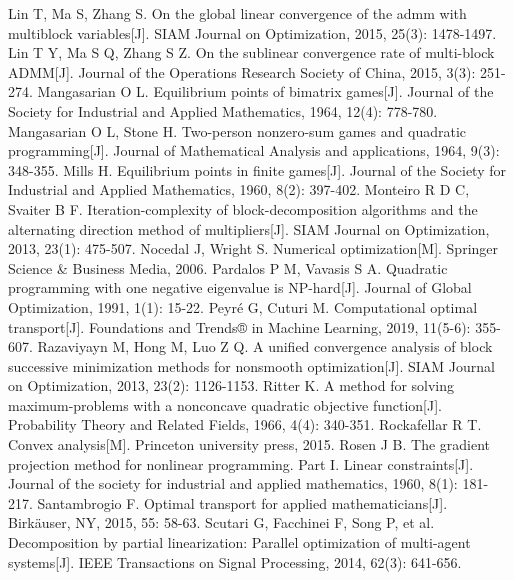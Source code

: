 \begin{thebibliography}{MM}
\begin{small}
		 Lin T, Ma S, Zhang S. On the global linear convergence of the admm with multiblock variables[J]. SIAM Journal on Optimization, 2015, 25(3): 1478-1497.
		 Lin T Y, Ma S Q, Zhang S Z. On the sublinear convergence rate of multi-block ADMM[J]. Journal of the Operations Research Society of China, 2015, 3(3): 251-274.
		 Mangasarian O L. Equilibrium points of bimatrix games[J]. Journal of the Society for Industrial and Applied Mathematics, 1964, 12(4): 778-780.
		 Mangasarian O L, Stone H. Two-person nonzero-sum games and quadratic programming[J]. Journal of Mathematical Analysis and applications, 1964, 9(3): 348-355.
		 Mills H. Equilibrium points in finite games[J]. Journal of the Society for Industrial and Applied Mathematics, 1960, 8(2): 397-402.
		 Monteiro R D C, Svaiter B F. Iteration-complexity of block-decomposition algorithms and the alternating direction method of multipliers[J]. SIAM Journal on Optimization, 2013, 23(1): 475-507.
		 Nocedal J, Wright S. Numerical optimization[M]. Springer Science \& Business Media, 2006.
		 Pardalos P M, Vavasis S A. Quadratic programming with one negative eigenvalue is NP-hard[J]. Journal of Global Optimization, 1991, 1(1): 15-22.
		 Peyré G, Cuturi M. Computational optimal transport[J]. Foundations and Trends® in Machine Learning, 2019, 11(5-6): 355-607.
		 Razaviyayn M, Hong M, Luo Z Q. A unified convergence analysis of block successive minimization methods for nonsmooth optimization[J]. SIAM Journal on Optimization, 2013, 23(2): 1126-1153.
		 Ritter K. A method for solving maximum-problems with a nonconcave quadratic objective function[J]. Probability Theory and Related Fields, 1966, 4(4): 340-351.
		 Rockafellar R T. Convex analysis[M]. Princeton university press, 2015.
		 Rosen J B. The gradient projection method for nonlinear programming. Part I. Linear constraints[J]. Journal of the society for industrial and applied mathematics, 1960, 8(1): 181-217.
		 Santambrogio F. Optimal transport for applied mathematicians[J]. Birkäuser, NY, 2015, 55: 58-63.
		 Scutari G, Facchinei F, Song P, et al. Decomposition by partial linearization: Parallel optimization of multi-agent systems[J]. IEEE Transactions on Signal Processing, 2014, 62(3): 641-656.

\end{small}
\end{thebibliography}
